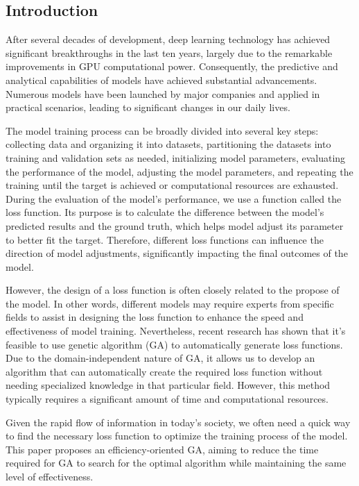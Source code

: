 \begin{ZhChapter}

\chapter{Introduction}

After several decades of development, deep learning \cite{deepLearning} technology has achieved significant breakthroughs in the last ten years, largely due to the remarkable improvements in GPU computational power. Consequently, the predictive and analytical capabilities of models have achieved substantial advancements. Numerous models have been launched by major companies and applied in practical scenarios, leading to significant changes in our daily lives.

The model training process can be broadly divided into several key steps: collecting data and organizing it into datasets, partitioning the datasets into training and validation sets as needed, initializing model parameters, evaluating the performance of the model, adjusting the model parameters, and repeating the training until the target is achieved or computational resources are exhausted. During the evaluation of the model's performance, we use a function called the loss function\cite{janocha2017lossfunctionsdeepneural}. Its purpose is to calculate the difference between the model's predicted results and the ground truth, which helps model adjust its parameter to better fit the target. Therefore, different loss functions can influence the direction of model adjustments, significantly impacting the final outcomes of the model.

However, the design of a loss function is often closely related to the propose of the model\cite{lossFunctionMakeDifference}. In other words, different models may require experts from specific fields to assist in designing the loss function to enhance the speed and effectiveness of model training. Nevertheless, recent research has shown that it's feasible to use genetic algorithm (GA) \cite{geneticProgramming} to automatically generate loss functions. Due to the domain-independent nature of GA, it allows us to develop an algorithm that can automatically create the required loss function without needing specialized knowledge in that particular field. However, this method typically requires a significant amount of time and computational resources.

Given the rapid flow of information in today's society, we often need a quick way to find the necessary loss function to optimize the training process of the model. This paper proposes an efficiency-oriented GA, aiming to reduce the time required for GA to search for the optimal algorithm while maintaining the same level of effectiveness.


\end{ZhChapter}
